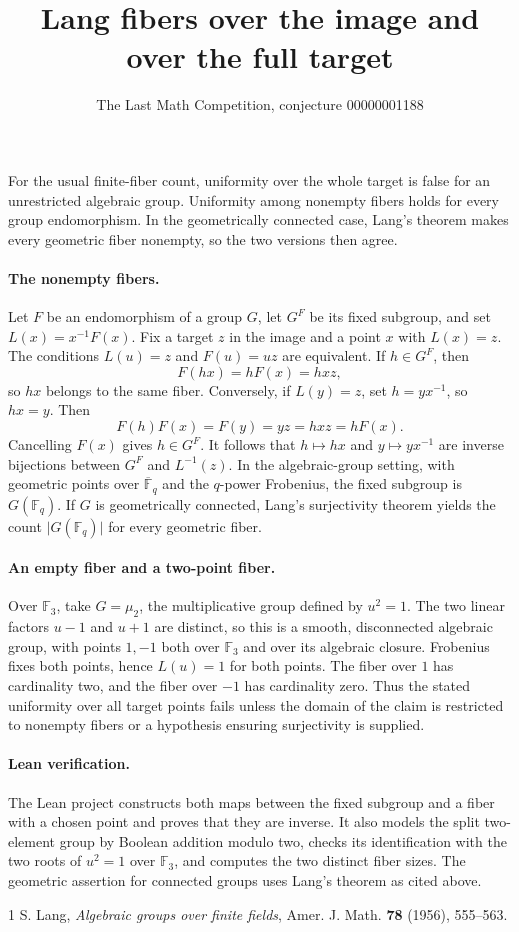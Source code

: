 \documentclass[11pt]{article}
\title{Lang fibers over the image and over the full target}
\author{The Last Math Competition, conjecture 00000001188}
\date{}
\begin{document}
\maketitle

For the usual finite-fiber count, uniformity over the whole target is false
for an unrestricted algebraic group. Uniformity among nonempty fibers
holds for every group endomorphism. In the geometrically connected case,
Lang's theorem makes every geometric fiber nonempty, so the two versions
then agree.

\paragraph{The nonempty fibers.}
Let \(F\) be an endomorphism of a group \(G\), let \(G^F\) be its fixed
subgroup, and set \(L(x)=x^{-1}F(x)\). Fix a target \(z\) in the image and
a point \(x\) with \(L(x)=z\). The conditions \(L(u)=z\) and \(F(u)=uz\)
are equivalent. If \(h\in G^F\), then
\[
 F(hx)=hF(x)=hxz,
\]
so \(hx\) belongs to the same fiber. Conversely, if \(L(y)=z\), set
\(h=yx^{-1}\), so \(hx=y\). Then
\[
 F(h)F(x)=F(y)=yz=hx z=hF(x).
\]
Cancelling \(F(x)\) gives \(h\in G^F\). It follows that
\(h\mapsto hx\) and \(y\mapsto yx^{-1}\) are inverse bijections between
\(G^F\) and \(L^{-1}(z)\). In the algebraic-group setting, with geometric
points over \(\overline{\mathbb F}_q\) and the \(q\)-power Frobenius, the
fixed subgroup is \(G(\mathbb F_q)\). If \(G\) is geometrically connected,
Lang's surjectivity theorem \cite{lang} yields the count
\(\lvert G(\mathbb F_q)\rvert\) for every geometric fiber.

\paragraph{An empty fiber and a two-point fiber.}
Over \(\mathbb F_3\), take \(G=\mu_2\), the multiplicative group defined
by \(u^2=1\). The two linear factors \(u-1\) and \(u+1\) are distinct,
so this is a smooth, disconnected algebraic group, with points \(1,-1\)
both over \(\mathbb F_3\) and over its algebraic closure. Frobenius fixes
both points, hence \(L(u)=1\) for both points. The fiber over \(1\) has
cardinality two, and the fiber over \(-1\) has cardinality zero. Thus the
stated uniformity over all target points fails unless the domain of the
claim is restricted to nonempty fibers or a hypothesis ensuring
surjectivity is supplied.

\paragraph{Lean verification.}
The Lean project constructs both maps between the fixed subgroup and a
fiber with a chosen point and proves that they are inverse. It also
models the split two-element group by Boolean addition modulo two,
checks its identification with the two roots of \(u^2=1\) over
\(\mathbb F_3\), and computes the two distinct fiber sizes. The
geometric assertion for connected groups uses Lang's theorem as cited
above.

\begin{thebibliography}{1}
 S. Lang, \emph{Algebraic groups over finite fields},
Amer. J. Math. \textbf{78} (1956), 555--563.
\end{thebibliography}
\end{document}
